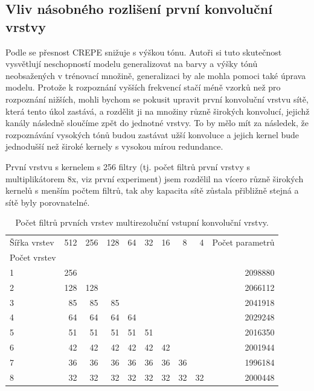 

\subsection{Vliv násobného rozlišení první konvoluční vrstvy}

Podle \cite{Kim2018} se přesnost CREPE snižuje s výškou tónu. Autoři si tuto skutečnost vysvětlují neschopností modelu generalizovat na barvy a výšky tónů neobsažených v trénovací množině, generalizaci by ale mohla pomoci také úprava modelu. Protože k rozpoznání vyšších frekvencí stačí méně vzorků než pro rozpoznání nižších, mohli bychom se pokusit upravit první konvoluční vrstvu sítě, která tento úkol zastává, a rozdělit ji na množiny různě širokých konvolucí, jejichž kanály následně sloučíme zpět do jednotné vrstvy. To by mělo mít za následek, že rozpoznávání vysokých tónů budou zastávat užší konvoluce a jejich kernel bude jednodušší než široké kernely s vysokou mírou redundance.

První vrstvu s kernelem s 256 filtry (tj. počet filtrů první vrstvy s multiplikátorem 8x, viz první experiment) jsem rozdělil na vícero různě širokých kernelů s menším počtem filtrů, tak aby kapacita sítě zůstala přibližně stejná a sítě byly porovnatelné. 

\begin{table}[h!]
\centering
    \begin{tabular}{lrrrrrrrrr}
    \toprule
    Šířka vrstev & 512 & 256 & 128 & 64 & 32 & 16 & 8  & 4  & Počet parametrů  \\
    Počet vrstev & {} & {} & {} & {} & {} & {} & {}  & {}  & {}  \\
    \midrule
    1                   & 256 &     &     &    &    &    &    &    & 2098880 \\
    2                   & 128 & 128 &     &    &    &    &    &    & 2066112 \\
    3                   & 85  & 85  & 85  &    &    &    &    &    & 2041918 \\
    4                   & 64  & 64  & 64  & 64 &    &    &    &    & 2029248 \\
    5                   & 51  & 51  & 51  & 51 & 51 &    &    &    & 2016350 \\
    6                   & 42  & 42  & 42  & 42 & 42 & 42 &    &    & 2001944 \\
    7                   & 36  & 36  & 36  & 36 & 36 & 36 & 36 &    & 1996184 \\
    8                   & 32  & 32  & 32  & 32 & 32 & 32 & 32 & 32 & 2000448 \\
    \bottomrule
    \end{tabular}
\caption{Počet filtrů prvních vrstev multirezoluční vstupní konvoluční vrstvy.}\label{tab:crepe_velikosti_multirozliseni}
\end{table}

